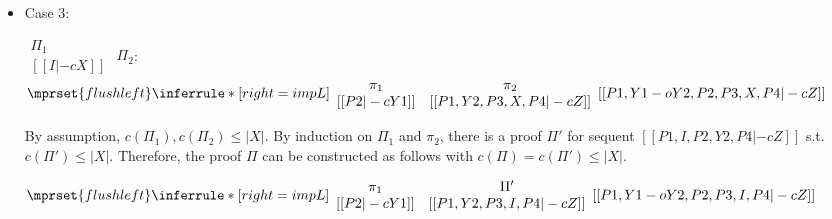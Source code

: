 \begin{itemize}
\item Case 3:
      \begin{center}
        \scriptsize
        \begin{math}
          \begin{array}{c}
            \Pi_1 \\
            {[[I |-c X]]}
          \end{array}
        \end{math}
        \qquad\qquad
        $\Pi_2$:
        \begin{math}
          $$\mprset{flushleft}
          \inferrule* [right={\tiny impL}] {
            {
              \begin{array}{cc}
                \pi_1 & \pi_2 \\
                {[[P2 |-c Y1]]} & {[[P1, Y2, P3, X, P4 |-c Z]]}
              \end{array}
            }
          }{[[P1, Y1 -o Y2, P2, P3, X, P4 |-c Z]]}
        \end{math}
      \end{center}
      By assumption, $c(\Pi_1),c(\Pi_2)\leq |X|$. By induction on $\Pi_1$
      and $\pi_2$, there is a proof $\Pi'$ for sequent
      $[[P1, I, P2, Y2, P4 |-c Z]]$ s.t. $c(\Pi') \leq |X|$. Therefore,
      the proof $\Pi$ can be constructed as follows with
      $c(\Pi) = c(\Pi') \leq |X|$.
      \begin{center}
        \scriptsize
        \begin{math}
          $$\mprset{flushleft}
          \inferrule* [right={\tiny impL}] {
            {
              \begin{array}{cc}
                \pi_1 & \Pi' \\
                {[[P2 |-c Y1]]} & {[[P1, Y2, P3, I, P4 |-c Z]]}
              \end{array}
            }
          }{[[P1, Y1 -o Y2, P2, P3, I, P4 |-c Z]]}
        \end{math}
      \end{center}


\end{itemize}
